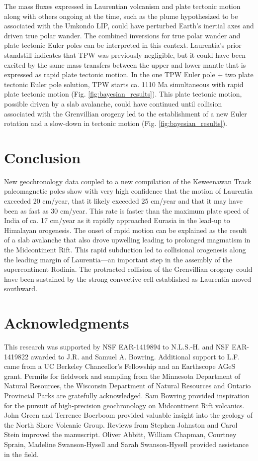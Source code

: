 \documentclass[11pt,letterpaper]{article}
\begin{document}
The mass fluxes expressed in Laurentian volcanism and plate tectonic motion along with others ongoing at the time, such as the plume hypothesized to be associated with the Umkondo LIP, could have perturbed Earth's inertial axes and driven true polar wander. The combined inversions for true polar wander and plate tectonic Euler poles can be interpreted in this context. Laurentia's prior standstill indicates that TPW was previously negligible, but it could have been excited by the same mass transfers between the upper and lower mantle that is expressed as rapid plate tectonic motion. In the one TPW Euler pole + two plate tectonic Euler pole solution, TPW starts ca. 1110 Ma simultaneous with rapid plate tectonic motion (Fig. \ref{fig:bayesian_results}). This plate tectonic motion, possible driven by a slab avalanche, could have continued until collision associated with the Grenvillian orogeny led to the establishment of a new Euler rotation and a slow-down in tectonic motion (Fig. \ref{fig:bayesian_results}).

\section{Conclusion}

New geochronology data coupled to a new compilation of the Keweenawan Track paleomagnetic poles show with very high confidence that the motion of Laurentia exceeded 20 cm/year, that it likely exceeded 25 cm/year and that it may have been as fast as 30 cm/year. This rate is faster than the maximum plate speed of India of ca. 17 cm/year as it rapidly approached Eurasia in the lead-up to Himalayan orogenesis. The onset of rapid motion can be explained as the result of a slab avalanche that also drove upwelling leading to prolonged magmatism in the Midcontinent Rift. This rapid subduction led to collisional orogenesis along the leading margin of Laurentia---an important step in the assembly of the supercontinent Rodinia. The protracted collision of the Grenvillian orogeny could have been sustained by the strong convective cell established as Laurentia moved southward.

\section*{Acknowledgments}

This research was supported by NSF EAR-1419894 to N.L.S.-H. and NSF EAR-1419822 awarded to J.R. and Samuel A. Bowring. Additional support to L.F. came from a UC Berkeley Chancellor's Fellowship and an Earthscope AGeS grant. Permits for fieldwork and sampling from the Minnesota Department of Natural Resources, the Wisconsin Department of Natural Resources and Ontario Provincial Parks are gratefully acknowledged. Sam Bowring provided inspiration for the pursuit of high-precision geochronology on Midcontinent Rift volcanics. John Green and Terrence Boerboom provided valuable insight into the geology of the North Shore Volcanic Group. Reviews from Stephen Johnston and Carol Stein improved the manuscript. Oliver Abbitt, William Chapman, Courtney Sprain, Madeline Swanson-Hysell and Sarah Swanson-Hysell provided assistance in the field.
\end{document}
